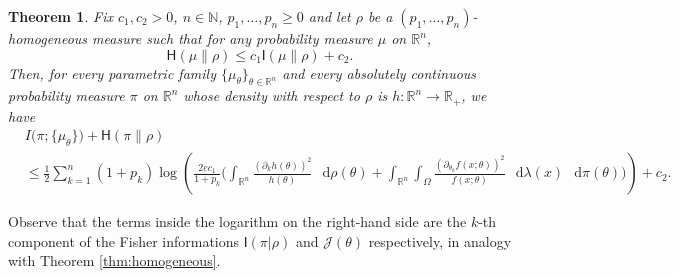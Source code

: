 \documentclass[a4paper,twoside,11pt,reqno]{amsart}
\newtheorem{theorem}{Theorem}
\newcommand*\diff{\mathop{}\!\mathrm{d}}
\newcommand{\R}{\mathbb{R}} %
\newcommand{\N}{\mathbb{N}}
\newcommand{\ms}{\mathscr}
\newcommand{\II}{\mathsf{I}}
\newcommand{\HH}{\mathsf{H}}
\begin{document}
\begin{theorem} \label{thm:cramer-rao}
Fix $c_1,c_2>0$, $n\in\N$, $p_1,\ldots,p_n\geq0$ and let $\rho$ be a $(p_1,\ldots,p_n)$-homogeneous measure  such that for any probability measure $\mu$ on $\R^n$,
\begin{equation} \label{eq:cr-assumption}
\HH(\mu\|\rho)\leq c_1 \II(\mu\|\rho) + c_2.
\end{equation}
Then, for every parametric family $\{\mu_\theta\}_{\theta\in\R^n}$ and every absolutely continuous probability measure $\pi$ on $\R^n$ whose density with respect to $\rho$ is $h:\R^n\to\R_+$, we have
\begin{equation}
\begin{split}
&I\big(\pi;\{\mu_\theta\}\big)+ \HH(\pi\|\rho)
\\& \leq \frac{1}{2}\sum_{k=1}^n (1+p_k) \log\left( \frac{2ec_1}{1+p_k}\Big(\int_{\R^n} \frac{(\partial_{k} h(\theta))^2}{h(\theta)}\,\diff\rho(\theta) + \int_{\R^n} \int_\Omega \frac{(\partial_{\theta_k} f(x;\theta))^2}{f(x;\theta)} \,\diff\lambda(x)\,\diff\pi(\theta)\Big) \right) + c_2.
\end{split}
\end{equation}
\end{theorem}

Observe that the terms inside the logarithm on the right-hand side are the $k$-th component of the Fisher informations $\II(\pi|\rho)$ and $\ms{J}(\theta)$ respectively, in analogy with Theorem \ref{thm:homogeneous}.
\end{document}
